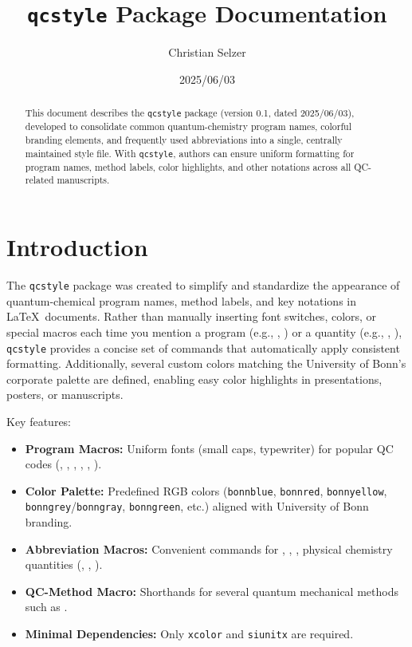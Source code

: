 \documentclass[a4paper,12pt]{article}
\title{\texttt{qcstyle} Package Documentation}
\author{Christian Selzer}
\date{2025/06/03}
\begin{document}
\maketitle

\begin{abstract}
This document describes the \texttt{qcstyle} package (version 0.1, dated 2025/06/03), developed to consolidate common quantum-chemistry program names, colorful branding elements, and frequently used abbreviations into a single, centrally maintained style file. With \texttt{qcstyle}, authors can ensure uniform formatting for program names, method labels, color highlights, and other notations across all QC-related manuscripts. 
\end{abstract}

\tableofcontents
\bigskip

\section{Introduction}
The \texttt{qcstyle} package was created to simplify and standardize the appearance of quantum-chemical program names, method labels, and key notations in \LaTeX\ documents. Rather than manually inserting font switches, colors, or special macros each time you mention a program (e.g., \orca, \xtb) or a quantity (e.g., \pka, \dgsolv), \texttt{qcstyle} provides a concise set of commands that automatically apply consistent formatting. Additionally, several custom colors matching the University of Bonn’s corporate palette are defined, enabling easy color highlights in presentations, posters, or manuscripts.  

\medskip
Key features:
\begin{itemize}
  \item \textbf{Program Macros:} Uniform fonts (small caps, typewriter) for popular QC codes (\orca, \censo, \draco, \crest, \xtb, \tblite).
  \item \textbf{Color Palette:} Predefined RGB colors (\texttt{bonnblue}, \texttt{bonnred}, \texttt{bonnyellow}, \texttt{bonngrey}/\texttt{bonngray}, \texttt{bonngreen}, etc.) aligned with University of Bonn branding.
  \item \textbf{Abbreviation Macros:} Convenient commands for \etal, \ie, \eg, physical chemistry quantities (\pka, \dgsolv, \kcalmol).
  \item \textbf{QC-Method Macro:} Shorthands for several quantum mechanical methods such as  .
  \item \textbf{Minimal Dependencies:} Only \texttt{xcolor} and \texttt{siunitx} are required. 
\end{itemize}
\end{document}
